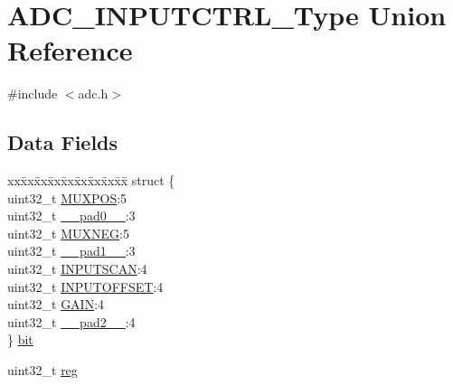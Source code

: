 \hypertarget{union_a_d_c___i_n_p_u_t_c_t_r_l___type}{}\section{A\+D\+C\+\_\+\+I\+N\+P\+U\+T\+C\+T\+R\+L\+\_\+\+Type Union Reference}
\label{union_a_d_c___i_n_p_u_t_c_t_r_l___type}


{\ttfamily \#include $<$adc.\+h$>$}

\subsection*{Data Fields}
\begin{DoxyCompactItemize}
\item 
\begin{tabbing}
xx\=xx\=xx\=xx\=xx\=xx\=xx\=xx\=xx\=\kill
struct \{\\
\>uint32\_t \mbox{\hyperlink{union_a_d_c___i_n_p_u_t_c_t_r_l___type_a393cedfc831a74b6c60b3b2e1996b6e7}{MUXPOS}}:5\\
\>uint32\_t \mbox{\hyperlink{union_a_d_c___i_n_p_u_t_c_t_r_l___type_a3e57c2ef1c3ffb36722f000cc1156824}{\_\_pad0\_\_}}:3\\
\>uint32\_t \mbox{\hyperlink{union_a_d_c___i_n_p_u_t_c_t_r_l___type_a2455c611dbb03edeab3248cb16ef7c6f}{MUXNEG}}:5\\
\>uint32\_t \mbox{\hyperlink{union_a_d_c___i_n_p_u_t_c_t_r_l___type_a6712ba6dd1d5b43d2d56ff8ac4e275a7}{\_\_pad1\_\_}}:3\\
\>uint32\_t \mbox{\hyperlink{union_a_d_c___i_n_p_u_t_c_t_r_l___type_a6c7243dbcc29722c0c20202f67b5b25b}{INPUTSCAN}}:4\\
\>uint32\_t \mbox{\hyperlink{union_a_d_c___i_n_p_u_t_c_t_r_l___type_aecaa084cc25734c4c657049dbe05a810}{INPUTOFFSET}}:4\\
\>uint32\_t \mbox{\hyperlink{union_a_d_c___i_n_p_u_t_c_t_r_l___type_ac0eb4e570b09de284fe5ba0af42d45d1}{GAIN}}:4\\
\>uint32\_t \mbox{\hyperlink{union_a_d_c___i_n_p_u_t_c_t_r_l___type_a9ce12a63de64ef64ae2d59d128251cae}{\_\_pad2\_\_}}:4\\
\} \mbox{\hyperlink{union_a_d_c___i_n_p_u_t_c_t_r_l___type_a5d7a06f0e39e0b8874e6a92b6776619f}{bit}}\\

\end{tabbing}\item 
uint32\+\_\+t \mbox{\hyperlink{union_a_d_c___i_n_p_u_t_c_t_r_l___type_a6b91636401516a477989a336376d7b40}{reg}}
\end{DoxyCompactItemize}


